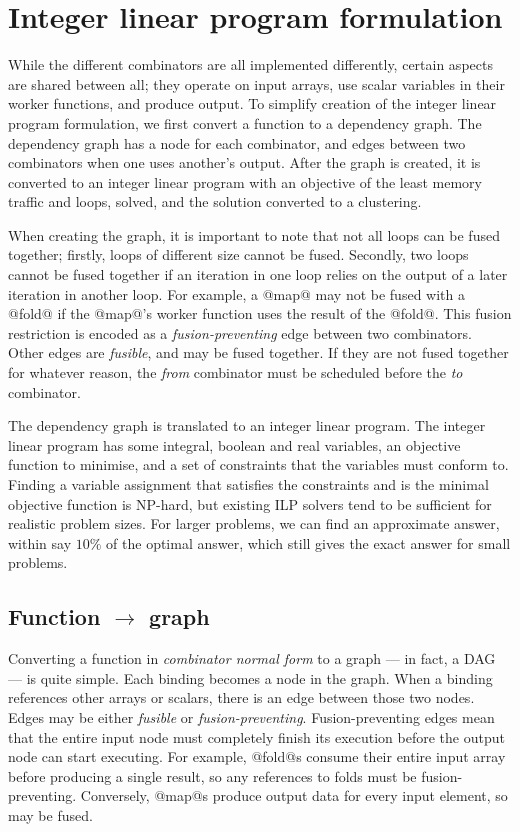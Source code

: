 \section{Integer linear program formulation}
While the different combinators are all implemented differently, certain aspects are shared between all; they operate on input arrays, use scalar variables in their worker functions, and produce output.
To simplify creation of the integer linear program formulation, we first convert a function to a dependency graph.
The dependency graph has a node for each combinator, and edges between two combinators when one uses another's output.
After the graph is created, it is converted to an integer linear program with an objective of the least memory traffic and loops, solved, and the solution converted to a clustering.

When creating the graph, it is important to note that not all loops can be fused together; firstly, loops of different size cannot be fused.
Secondly, two loops cannot be fused together if an iteration in one loop relies on the output of a later iteration in another loop.
For example, a @map@ may not be fused with a @fold@ if the @map@'s worker function uses the result of the @fold@.
This fusion restriction is encoded as a \emph{fusion-preventing} edge between two combinators.
Other edges are \emph{fusible}, and may be fused together.
If they are not fused together for whatever reason, the \emph{from} combinator must be scheduled before the \emph{to} combinator.

The dependency graph is translated to an integer linear program.
The integer linear program has some integral, boolean and real variables, an objective function to minimise, and a set of constraints that the variables must conform to.
Finding a variable assignment that satisfies the constraints and is the minimal objective function is NP-hard, but existing ILP solvers tend to be sufficient for realistic problem sizes.
For larger problems, we can find an approximate answer, within say $10\%$ of the optimal answer, which still gives the exact answer for small problems.

\subsection{Function $\to$ graph}
Converting a function in \emph{combinator normal form} to a graph --- in fact, a DAG --- is quite simple.
Each binding becomes a node in the graph.
When a binding references other arrays or scalars, there is an edge between those two nodes.
Edges may be either \emph{fusible} or \emph{fusion-preventing}.
Fusion-preventing edges mean that the entire input node must completely finish its execution before the output node can start executing.
For example, @fold@s consume their entire input array before producing a single result, so any references to folds must be fusion-preventing.
Conversely, @map@s produce output data for every input element, so may be fused.

